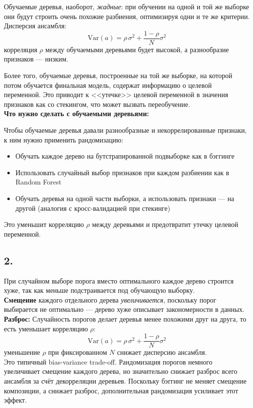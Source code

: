 \documentclass[12pt,a4paper]{article}
\begin{document}
Обучаемые деревья, наоборот, \textit{жадные}: при обучении на одной и той же выборке они будут строить очень похожие разбиения, оптимизируя одни и те же критерии. Дисперсия ансамбля:
\[
\text{Var}(a) = \rho\,\sigma^2 + \frac{1-\rho}{N}\sigma^2
\]
корреляция $\rho$ между обучаемыми деревьями будет высокой, а разнообразие признаков --- низким.

Более того, обучаемые деревья, построенные на той же выборке, на которой потом обучается финальная модель, содержат информацию о целевой переменной. Это приводит к <<утечке>> целевой переменной в значения признаков как со стекингом, что может вызвать переобучение.\\[1mm]
\textbf{Что нужно сделать с обучаемыми деревьями:}

Чтобы обучаемые деревья давали разнообразные и некоррелированные признаки, к ним нужно применить рандомизацию:
\begin{itemize}
\item Обучать каждое дерево на бутстрапированной подвыборке как в бэггинге
\item Использовать случайный выбор признаков при каждом разбиении как в Random Forest
\item Обучать деревья на одной части выборки, а использовать признаки --- на другой (аналогия с кросс-валидацией при стекинге)
\end{itemize}

Это уменьшит корреляцию $\rho$ между деревьями и предотвратит утечку целевой переменной.

\subsection*{2.}

При случайном выборе порога вместо оптимального каждое дерево строится хуже, так как меньше подстраивается под обучающую выборку.\\[1mm]
\textbf{Смещение} каждого отдельного дерева \textit{увеличивается}, поскольку порог выбирается не оптимально --- дерево хуже описывает закономерности в данных.\\[1mm]
\textbf{Разброс:} Случайность порогов делает деревья менее похожими друг на друга, то есть уменьшает корреляцию $\rho$:
\[
\text{Var}(a) = \rho\,\sigma^2 + \frac{1-\rho}{N}\sigma^2
\]
уменьшение $\rho$ при фиксированном $N$ снижает дисперсию ансамбля.\\[1mm]
Это типичный bias-variance trade-off. Рандомизация порогов немного увеличивает смещение каждого дерева, но значительно снижает разброс всего ансамбля за счёт декорреляции деревьев. Поскольку бэггинг не меняет смещение композиции, а снижает разброс, дополнительная рандомизация усиливает этот эффект.
\end{document}
